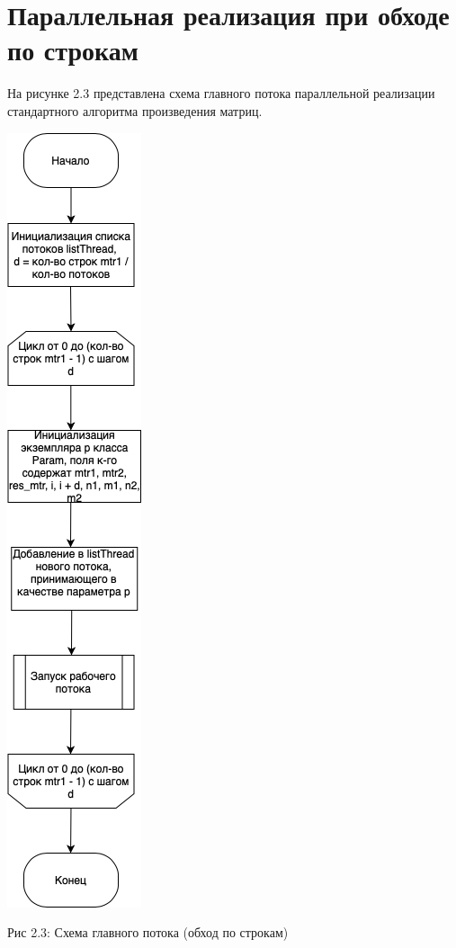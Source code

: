 \documentclass[12pt]{report}
\begin{document}
\newpage
\section{Параллельная реализация при обходе по строкам}

На рисунке 2.3 представлена схема главного потока параллельной реализации стандартного алгоритма произведения матриц.

\begin{center}
		\includegraphics[scale=0.5]{schema/ParRowMain.png}
		
			Рис 2.3: Схема главного потока (обход по строкам)
\end{center}
\end{document}
